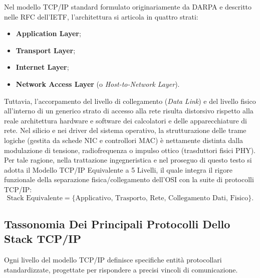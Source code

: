 \documentclass[11pt, a4paper]{article}
\begin{document}
Nel modello TCP/IP standard formulato originariamente da DARPA e descritto nelle RFC dell'IETF, l'architettura si articola in quattro strati:
\begin{itemize}[noitemsep]
    \item \textbf{Application Layer};
    \item \textbf{Transport Layer};
    \item \textbf{Internet Layer};
    \item \textbf{Network Access Layer} (o \emph{Host-to-Network Layer}).
\end{itemize}

Tuttavia, l'accorpamento del livello di collegamento (\emph{Data Link}) e del livello fisico all'interno di un generico strato di accesso alla rete risulta distorsivo rispetto alla reale architettura hardware e software dei calcolatori e delle apparecchiature di rete. Nel silicio e nei driver del sistema operativo, la strutturazione delle trame logiche (gestita da schede NIC e controllori MAC) è nettamente distinta dalla modulazione di tensione, radiofrequenza o impulso ottico (trasduttori fisici PHY). Per tale ragione, nella trattazione ingegneristica e nel proseguo di questo testo si adotta il Modello TCP/IP Equivalente a 5 Livelli, il quale integra il rigore funzionale della separazione fisica/collegamento dell'OSI con la suite di protocolli TCP/IP:
\begin{equation}
    \text{Stack Equivalente} = \{\text{Applicativo},\, \text{Trasporto},\, \text{Rete},\, \text{Collegamento Dati},\, \text{Fisico}\}.
\end{equation}

\subsection{Tassonomia Dei Principali Protocolli Dello Stack TCP/IP}

Ogni livello del modello TCP/IP definisce specifiche entità protocollari standardizzate, progettate per rispondere a precisi vincoli di comunicazione.

\end{document}

